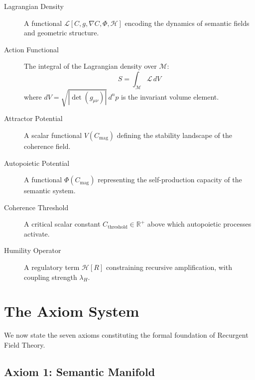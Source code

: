 \begin{description}

\item[Lagrangian Density] A functional \(\mathcal{L}[C, g, \nabla C, \Phi, \mathcal{H}]\) encoding the dynamics of semantic fields and geometric structure.

\item[Action Functional] The integral of the Lagrangian density over \(\mathcal{M}\):
\begin{equation}
S = \int_{\mathcal{M}} \mathcal{L} \, dV
\end{equation}
where \(dV = \sqrt{|\det(g_{\mu\nu})|} \, d^n p\) is the invariant volume element.

\item[Attractor Potential] A scalar functional \(V(C_{\text{mag}})\) defining the stability landscape of the coherence field.

\item[Autopoietic Potential] A functional \(\Phi(C_{\text{mag}})\) representing the self-production capacity of the semantic system.

\item[Coherence Threshold] A critical scalar constant \(C_{\text{threshold}} \in \mathbb{R}^+\) above which autopoietic processes activate.

\item[Humility Operator] A regulatory term \(\mathcal{H}[R]\) constraining recursive amplification, with coupling strength \(\lambda_H\).

\end{description}


\section{The Axiom System}
\label{1.2:the_axiom_system}

We now state the seven axioms constituting the formal foundation of Recurgent Field Theory.


\subsection{Axiom 1: Semantic Manifold}
\label{1.2.1:axiom_1_semantic_manifold}

